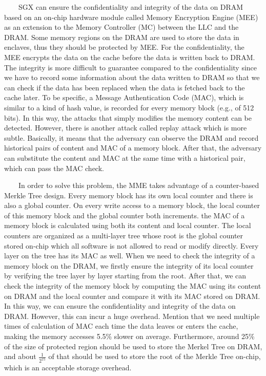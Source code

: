 \documentclass[12pt,twoside]{report}
\begin{document}
\ \ \ \ SGX can ensure the confidentiality and integrity of the data on DRAM based on an on-chip hardware module called Memory Encryption Engine (MEE)\cite{gueron2016memory} as an extension to the Memory Controller (MC) between the LLC and the DRAM. Some memory regions on the DRAM are used to store the data in enclaves, thus they should be protected by MEE. For the confidentiality, the MEE encrypts the data on the cache before the data is written back to DRAM. The integrity is more difficult to guarantee compared to the confidentiality since we have to record some information about the data written to DRAM so that we can check if the data has been replaced  when the data is fetched back to the cache later. To be specific, a  Message Authentication Code (MAC), which is similar to a kind of hash value, is recorded for every memory block (e.g., of 512 bits). In this way, the attacks that simply modifies the memory content can be detected. However, there is another attack called replay attack which is more subtle. Basically, it means that the adversary can observe the DRAM and record historical pairs of content and MAC of a memory block. After that, the adversary can substitute the content and MAC at the same time with a historical pair, which can pass the MAC check. 

\ \ \ \ In order to solve this problem, the MME takes advantage of a counter-based Merkle Tree design\cite{rogers2007using}. Every memory block has its own local counter and there is also a global counter. On every write access to a memory block, the local counter of this memory block and the global counter both increments. the MAC of a memory block is calculated using both its content and local counter. The local counters are organized as a multi-layer tree whose root is the global counter stored on-chip which all software is not allowed to read or modify directly. Every layer on the tree has its MAC as well. When we need to check the integrity of a memory block on the DRAM, we firstly ensure the integrity of its local counter by verifying the tree layer by layer starting from the root. After that, we can check the integrity of the memory block by computing the MAC using its content on DRAM and the local counter and compare it with its MAC stored on DRAM. In this way, we can ensure the confidentiality and integrity of the data on DRAM. However, this can incur a huge overhead. Mention that we need multiple times of calculation of MAC each time the data leaves or enters the cache, making the memory accesses 5.5\% slower on average\cite{gueron2016memory}. Furthermore, around 25\% of the size of protected region should be used to store the Merkel Tree on DRAM, and about $\frac{1}{2^{15}}$ of that should be used to store the root of the Merkle Tree on-chip\cite{gueron2016memory}, which is an acceptable storage overhead.
\end{document}
